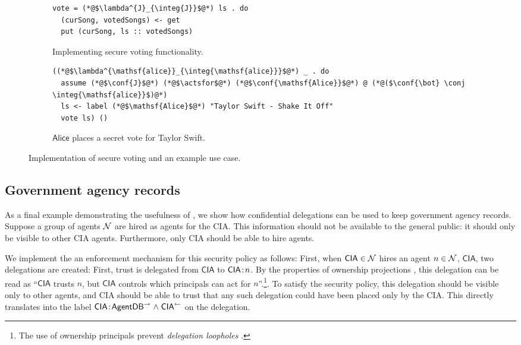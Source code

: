 \begin{figure}
\centering
\begin{subfigure}{0.5\textwidth}
\begin{lstlisting}
vote = (*@$\lambda^{J}_{\integ{J}}$@*) ls . do
  (curSong, votedSongs) <- get
  put (curSong, ls :: votedSongs)
\end{lstlisting}
\caption{Implementing secure voting functionality.}
\label{fig:vote-for-song}
\end{subfigure}
\begin{subfigure}{0.5\textwidth}
\begin{lstlisting}
((*@$\lambda^{\mathsf{alice}}_{\integ{\mathsf{alice}}}$@*) _ . do
  assume (*@$\conf{J}$@*) (*@$\actsfor$@*) (*@$\conf{\mathsf{Alice}}$@*) @ (*@($\conf{\bot} \conj \integ{\mathsf{alice}}$)@*)
  ls <- label (*@$\mathsf{Alice}$@*) "Taylor Swift - Shake It Off"
  vote ls) ()
\end{lstlisting}
\caption{$\mathsf{Alice}$ places a secret vote for Taylor Swift.}
\label{fig:jukebox-alice-votes-for-taylor-swift}
\end{subfigure}
\caption{Implementation of secure voting and an example use case.}
\end{figure}

\subsection{Government agency records}\label{subsec:agents}
As a final example demonstrating the usefulness of \lang, we show how confidential delegations can be used to keep government agency records. Suppose a group of agents $\mathcal{N}$ are hired as agents for the CIA. 
This information should not be available to the general public: it should only be visible to other CIA agents. Furthermore, only CIA should be able to hire agents.

We implement the an enforcement mechanism for this security policy as follows: First, when $\mathsf{CIA} \in \mathcal{N}$ hires an agent $n \in \mathcal{N}$, $\mathsf{CIA}$, two delegations are created: First, trust is delegated from $\mathsf{CIA}$ to $\mathsf{CIA}\!:\!n$. By the properties of ownership projections \cite{Arden:2015:FA:2859845.2859998}, this delegation can be read as ``$\mathsf{CIA}$ trusts $n$, but $\mathsf{CIA}$ controls which principals can act for $n$''.\footnote{The use of ownership principals prevent \emph{delegation loopholes} \cite{Arden:2015:FA:2859845.2859998}.}. To satisfy the security policy, this delegation should be visible only to other agents, and CIA should be able to trust that any such delegation could have been placed only by the CIA. This directly translates into the label $\mathsf{CIA}\!:\!\mathsf{AgentDB}^{\rightarrow} \mathrel{\land} \mathsf{CIA}^{\leftarrow}$ on the delegation.

